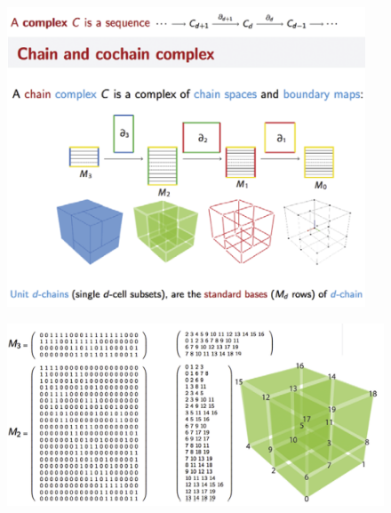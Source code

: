 \documentclass{beamer}
\begin{document}
\begin{frame}
\begin{figure}
    \centering
    \includegraphics[width=0.95\textwidth]{figs/L02-chain-complex.png}
\end{figure}
    
\end{frame}


\begin{frame}
\begin{figure}
    \centering
    \includegraphics[width=\textwidth]{figs/L02-characteristic-matrices.png}
\end{figure}
\end{frame}
\end{document}
